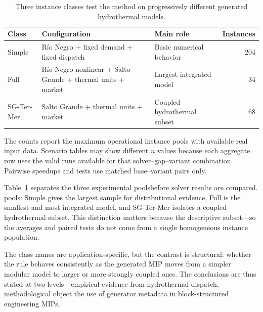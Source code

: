 \documentclass[AMA,Times1COL]{WileyNJDv5} %
\providecommand{\DIFadd}[1]{{\protect\color{blue} \sf #1}} %
\providecommand{\DIFdel}[1]{{\protect\color{red} \scriptsize #1}} %
\providecommand{\DIFaddbegin}{} %
\providecommand{\DIFaddend}{} %
\providecommand{\DIFdelbegin}{} %
\providecommand{\DIFdelend}{} %
\begin{document}
\begin{table}[t]
\centering
\caption{Three instance classes test the method on progressively different generated hydrothermal models.}
\label{tab:instance-stats}
\begin{threeparttable}
\small
\begin{tabular}{@{}p{}p{}p{}r@{}}
\toprule
Class & Configuration & Main role & Instances \\
\midrule
Simple & R\'io Negro + fixed demand + fixed dispatch & Basic numerical behavior & 204 \\
Full & R\'io Negro nonlinear + Salto Grande + thermal units + market & Largest integrated model & 34 \\
SG-Ter-Mer & Salto Grande + thermal units + market & Coupled hydrothermal subset & 68 \\
\bottomrule
\end{tabular}
\begin{tablenotes}[flushleft]\footnotesize
\item The counts report the maximum operational instance pools with available real input
      data. Scenario tables may show different $n$ values because each aggregate row uses
      the valid runs available for that solver--gap--variant combination. Pairwise
      speedups and tests use matched base--variant pairs only.
\end{tablenotes}
\end{threeparttable}
\end{table}

\noindent Table~\ref{tab:instance-stats} separates the three \DIFdelbegin \DIFdel{experimental poolsbefore solver results are compared. }\DIFdelend \DIFaddbegin \DIFadd{pools: }\DIFaddend Simple gives the largest
sample for distributional evidence, Full is the smallest and most integrated model, and
SG-Ter-Mer isolates a coupled hydrothermal \DIFdelbegin \DIFdel{subset. This distinction matters because the descriptive }\DIFdelend \DIFaddbegin \DIFadd{subset---so the }\DIFaddend averages and paired tests do not come
from a single homogeneous \DIFdelbegin \DIFdel{instance }\DIFdelend population.

\DIFaddbegin \DIFadd{The class names are application-specific, but the contrast is structural: whether the rule behaves
consistently as the generated MIP moves from a simpler modular model to larger or more strongly
coupled ones. The conclusions are thus stated at two levels---empirical evidence from hydrothermal
dispatch, methodological object the use of generator metadata in block-structured engineering
MIPs.
}
\end{document}
